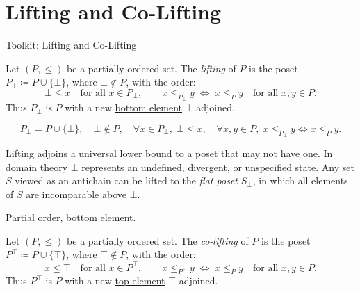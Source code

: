 
\section{Lifting and Co-Lifting}
\label{sec:lifting}

\begin{definitionbox}{Toolkit: Lifting and Co-Lifting}
\begin{definition}[Lifting]
\label{def:lifting}
Let $(P, \leq)$ be a partially ordered set.  The \emph{lifting} of $P$
is the poset $P_{\bot} \coloneqq P \cup \{\bot\}$, where $\bot \notin P$,
with the order:
\[
\bot \leq x \quad \text{for all } x \in P_{\bot},
\qquad
x \leq_{P_{\bot}} y \;\Longleftrightarrow\; x \leq_P y
\quad \text{for all } x, y \in P.
\]
Thus $P_{\bot}$ is $P$ with a new
\hyperref[def:bottom-element]{bottom element} $\bot$ adjoined.
\end{definition}
\end{definitionbox}

\begin{remark*}
\[
P_{\bot} = P \cup \{\bot\},\quad
\bot \notin P,\quad
\forall x \in P_{\bot},\; \bot \leq x,\quad
\forall x,y \in P,\; x \leq_{P_\bot} y \Leftrightarrow x \leq_P y.
\]
\end{remark*}

\begin{remark*}[Interpretation]
Lifting adjoins a universal lower bound to a poset that may not have one.
In domain theory $\bot$ represents an undefined, divergent, or
unspecified state.  Any set $S$ viewed as an antichain can be lifted to
the \emph{flat poset} $S_{\bot}$, in which all elements of $S$ are
incomparable above $\bot$.
\end{remark*}

\begin{remark*}[Dependencies]
\hyperref[def:partial-order]{Partial order},
\hyperref[def:bottom-element]{bottom element}.
\end{remark*}


\begin{definition}[Co-Lifting]
\label{def:co-lifting}
Let $(P, \leq)$ be a partially ordered set.  The \emph{co-lifting} of $P$
is the poset $P^{\top} \coloneqq P \cup \{\top\}$, where $\top \notin P$,
with the order:
\[
x \leq \top \quad \text{for all } x \in P^{\top},
\qquad
x \leq_{P^{\top}} y \;\Longleftrightarrow\; x \leq_P y
\quad \text{for all } x, y \in P.
\]
Thus $P^{\top}$ is $P$ with a new
\hyperref[def:top-element]{top element} $\top$ adjoined.
\end{definition}

